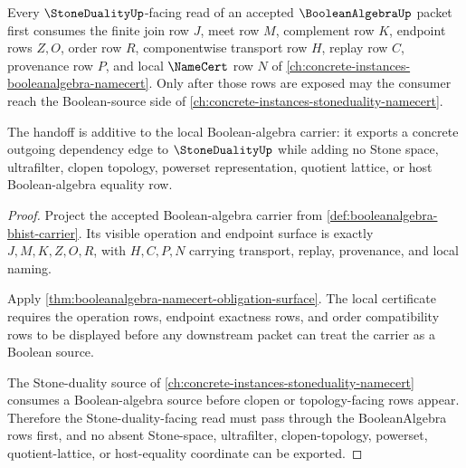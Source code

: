 \begin{theorem}
\label{thm:booleanalgebra-stone-duality-handoff}
Every $\StoneDualityUp$-facing read of an accepted $\BooleanAlgebraUp$ packet first consumes the finite join row $J$, meet row $M$, complement row $K$, endpoint rows $Z,O$, order row $R$, componentwise transport row $H$, replay row $C$, provenance row $P$, and local $\NameCert$ row $N$ of \autoref{ch:concrete-instances-booleanalgebra-namecert}. Only after those rows are exposed may the consumer reach the Boolean-source side of \autoref{ch:concrete-instances-stoneduality-namecert}.

The handoff is additive to the local Boolean-algebra carrier: it exports a concrete outgoing dependency edge to $\StoneDualityUp$ while adding no Stone space, ultrafilter, clopen topology, powerset representation, quotient lattice, or host Boolean-algebra equality row.
\end{theorem}
\begin{proof}
Project the accepted Boolean-algebra carrier from \autoref{def:booleanalgebra-bhist-carrier}. Its visible operation and endpoint surface is exactly $J,M,K,Z,O,R$, with $H,C,P,N$ carrying transport, replay, provenance, and local naming.

Apply \autoref{thm:booleanalgebra-namecert-obligation-surface}. The local certificate requires the operation rows, endpoint exactness rows, and order compatibility rows to be displayed before any downstream packet can treat the carrier as a Boolean source.

The Stone-duality source of \autoref{ch:concrete-instances-stoneduality-namecert} consumes a Boolean-algebra source before clopen or topology-facing rows appear. Therefore the Stone-duality-facing read must pass through the BooleanAlgebra rows first, and no absent Stone-space, ultrafilter, clopen-topology, powerset, quotient-lattice, or host-equality coordinate can be exported.
\end{proof}
